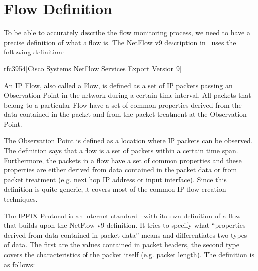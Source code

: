 \section{Flow Definition}\label{sec:flow-definition}


To be able to accurately describe the flow monitoring process, we need to have a precise definition of what a flow is. The NetFlow v9 description in~\cite{rfc3954} uses the following definition:

\begin{displaycquote}{rfc3954}[Cisco Systems NetFlow Services Export Version 9]

    An IP Flow, also called a Flow, is defined as a set of IP packets
    passing an Observation Point in the network during a certain time
    interval. All packets that belong to a particular Flow have a set of
    common properties derived from the data contained in the packet and
    from the packet treatment at the Observation Point.

\end{displaycquote}

The Observation Point is defined as a location where IP packets can be observed. The definition says that a flow is a set of packets within a certain time span. Furthermore, the packets in a flow have a set of common properties and these properties are either derived from data contained in the packet data or from packet treatment (e.g. next hop IP address or input interface). Since this definition is quite generic, it covers most of the common IP flow creation techniques.

The IPFIX Protocol is an internet standard~\cite{rfc7011} with its own definition of a flow that builds upon the NetFlow v9 definition. It tries to specify what “properties derived from data contained in packet data” means and differentiates two types of data. The first are the values contained in packet headers, the second type covers the characteristics of the packet itself (e.g. packet length). The definition is as follows:

